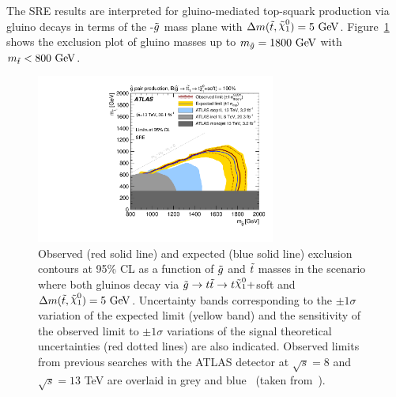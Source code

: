 			The SRE results are interpreted for gluino-mediated top-squark production via gluino decays in terms of the \stop-$\tilde{g}$ mass plane with $\Delta m(\stop,\ninoone)=5\GeV$. Figure~\ref{fig:SRE_exclusion} shows the exclusion plot of gluino masses up to $m_{\gluino}=1800\GeV$ with $\mstop<800\GeV$.

			\begin{figure}[htpb]
			  \begin{center}
			    \includegraphics[width=0.7\textwidth]{figures/fit/SRE_exclusion}
			    \caption{Observed (red solid line) and expected (blue solid line)
			      exclusion contours at 95\% CL as a function
			      of $\tilde{g}$ and $\tilde{t}$ masses in the scenario where both
			      gluinos decay via $\gluino\to t\stop\to t\ninoone+$soft
			      and $\Delta m(\stop,\ninoone)=5\GeV$. Uncertainty bands corresponding to the $\pm 1
			      \sigma$ variation of the expected limit (yellow band) and the
			      sensitivity of the observed limit to $\pm 1\sigma$ variations of
			      the signal theoretical uncertainties (red dotted lines) are also
			      indicated. Observed limits from previous searches with the ATLAS detector at $\sqrt{s}=8$ and $\sqrt{s}=13$ TeV are overlaid in grey and blue~\cite{stop1L,Gtc1L,GtcMonojet} (taken from~\cite{stop0L}).}
			    \label{fig:SRE_exclusion}
			  \end{center}
			\end{figure}
